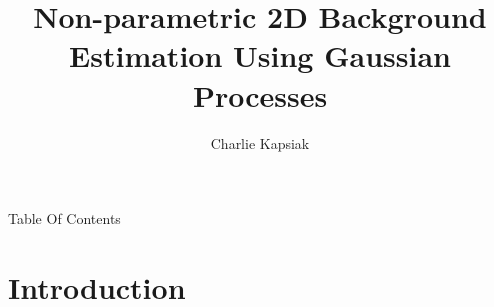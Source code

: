 \documentclass[10pt]{beamer}
\author{Charlie Kapsiak}
\title{Non-parametric 2D Background Estimation Using Gaussian Processes}
\newcommand{\commonfiles}[1]{../common/#1}
\begin{document}
\begin{frame}
  \maketitle
\end{frame}

\begin{frame}{Table Of Contents}
  \tableofcontents
\end{frame}

\begin{frame}{Overview}
  }
\end{frame}


% 
% 
% 
% 
% 
% 

\section{Introduction}
\end{document}
